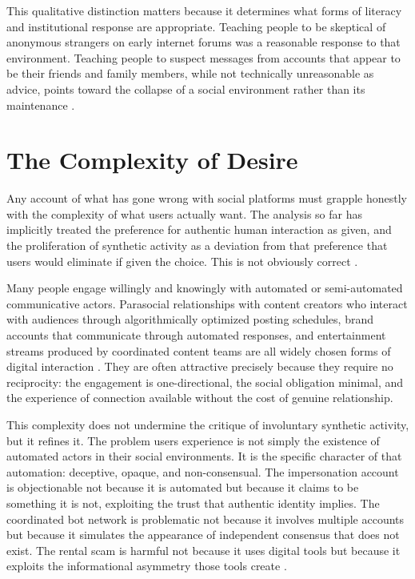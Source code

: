 \documentclass[12pt,a4paper]{article}
\begin{document}
This qualitative distinction matters because it determines what forms of literacy and institutional
response are appropriate. Teaching people to be skeptical of anonymous strangers on early internet
forums was a reasonable response to that environment. Teaching people to suspect messages from
accounts that appear to be their friends and family members, while not technically unreasonable
as advice, points toward the collapse of a social environment rather than its maintenance
\citep{tufekci2015}.

\section{The Complexity of Desire}

Any account of what has gone wrong with social platforms must grapple honestly with the complexity
of what users actually want. The analysis so far has implicitly treated the preference for authentic
human interaction as given, and the proliferation of synthetic activity as a deviation from that
preference that users would eliminate if given the choice. This is not obviously correct
\citep{boyd2014}.

Many people engage willingly and knowingly with automated or semi-automated communicative actors.
Parasocial relationships with content creators who interact with audiences through algorithmically
optimized posting schedules, brand accounts that communicate through automated responses, and
entertainment streams produced by coordinated content teams are all widely chosen forms of digital
interaction \citep{wu2016}. They are often attractive precisely because they require no
reciprocity: the engagement is one-directional, the social obligation minimal, and the experience
of connection available without the cost of genuine relationship.

This complexity does not undermine the critique of involuntary synthetic activity, but it refines
it. The problem users experience is not simply the existence of automated actors in their social
environments. It is the specific character of that automation: deceptive, opaque, and
non-consensual. The impersonation account is objectionable not because it is automated but
because it claims to be something it is not, exploiting the trust that authentic identity implies.
The coordinated bot network is problematic not because it involves multiple accounts but because
it simulates the appearance of independent consensus that does not exist. The rental scam is
harmful not because it uses digital tools but because it exploits the informational asymmetry
those tools create \citep{gillespie2018,noble2018}.
\end{document}
